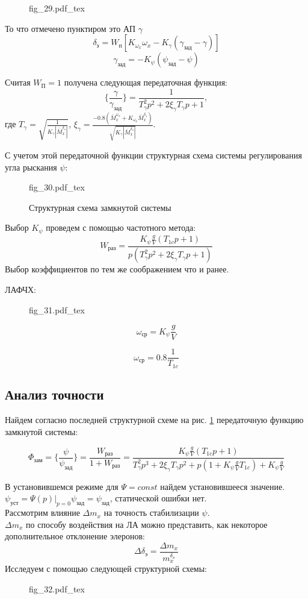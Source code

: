 \documentclass{article}
\begin{document}
\begin{figure}[H]
	\centering
	{fig_29.pdf_tex}
\end{figure}

То что отмечено пунктиром это АП $\gamma$
\[
	\delta_\text{э} = W_\text{п}[K_{\omega_x}\omega_x -
		K_{\gamma}(\gamma_\text{зад} - \gamma)]
\]
\[
	\gamma_\text{зад} = -K_{\psi}(\psi_\text{зад} - \psi)
\]

Считая $W_\text{П} = 1$ получена следующая передаточная функция:
\[
	\{\frac{\gamma}{\gamma_\text{зад}} \}=\frac{1}{T_{\gamma}^2 p^2 + 2
		\xi_{\gamma} T_\gamma p + 1},
\]
где $T_{\gamma} = \sqrt{\frac{1}{K_{\gamma}|\bar{M}_x^{\delta_\text{э}}|}}$,
$\xi_{\gamma} =\frac{-0.8(\bar{M}_x^{\omega_x} + K_{\omega_x}
	\bar{M}_x^{\delta_\text{э}})}{\sqrt{K_\gamma |\bar{M}_x^{\delta_\text{э}}|}}$.

С учетом этой передаточной функции структурная схема системы регулирования угла
рыскания $\psi$:

\begin{figure}[h]
	\centering
	{fig_30.pdf_tex}
	\caption{Структурная схема замкнутой системы}
	\label{fig:zam30}
\end{figure}

Выбор $K_{\psi}$ проведем с помощью частотного метода:
\[
	W_\text{раз} = \frac{K_{\psi} \frac{g}{V} (T_{1c}p + 1)}{p(T_{\gamma}^2 p^2
		+ 2 \xi_\gamma T_\gamma p + 1)}
\]
Выбор коэффициентов по тем же соображением что и ранее.


ЛАФЧХ:
\begin{figure}[H]
	\centering
	{fig_31.pdf_tex}
\end{figure}

\[
	\omega_\text{ср} = K_{\psi}\frac{g}{V}
\]

\[
	\omega_\text{ср} = 0.8\frac{1}{T_{1c}}
\]

\subsection{Анализ точности}
Найдем согласно последней структурной схеме на рис. \ref{fig:zam30}
передаточную функцию замкнутой системы:

\[
	\Phi_\text{зам} = \{\frac{\psi}{\psi_\text{зад}} \} = \frac{W_\text{раз}}{1
		+ W_\text{раз}} = \frac{K_{\psi}\frac{g}{V}(T_{1c}p + 1)}{T_{\gamma}^2 p^3
		+ 2\xi_\gamma T_\gamma p^2 + p(1 + K_{\psi}\frac{g}{V} T_{1c}) +
		K_{\psi}\frac{g}{V}}
\]

В установившемся режиме для $\Psi = const$ найдем установившееся значение.\\
$\psi_\text{уст} = \Psi(p) |_{p=0}  \psi _\text{зад}= \psi_\text{зад}$,
статической ошибки нет.\\
Рассмотрим влияние $\Delta m_x$ на точность стабилизации $\psi$.\\
$\Delta m_x$ по способу воздействия на ЛА можно представить, как некоторое
дополнительное отклонение элеронов:
\[
	\Delta \delta_\text{э} =\frac{\Delta m_x}{m_x^{\delta_\text{э}}}
\]
Исследуем с помощью следующей структурной схемы:
\begin{figure}[H]
	\centering
	{fig_32.pdf_tex}
\end{figure}
\end{document}
